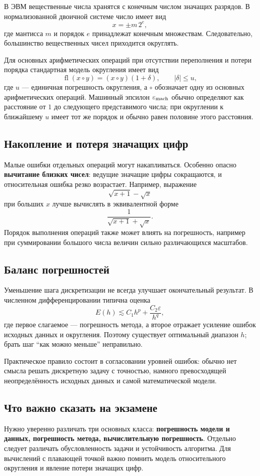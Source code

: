 В ЭВМ вещественные числа хранятся с конечным числом значащих разрядов.
В нормализованной двоичной системе число имеет вид
\[
x=\pm m\,2^e,
\]
где мантисса $m$ и порядок $e$ принадлежат конечным множествам.
Следовательно, большинство вещественных чисел приходится округлять.

Для основных арифметических операций при отсутствии переполнения и
потери порядка стандартная модель округления имеет вид
\[
\boxed{
\operatorname{fl}(x\circ y)
=(x\circ y)(1+\delta),
\qquad |\delta|\le u,
}
\]
где $u$ --- единичная погрешность округления, а $\circ$ обозначает одну из
основных арифметических операций. Машинный эпсилон
$\varepsilon_{\rm mach}$ обычно определяют как расстояние от $1$ до
следующего представимого числа; при округлении к ближайшему $u$ имеет тот
же порядок и обычно равен половине этого расстояния.

\subsection{Накопление и потеря значащих цифр}

Малые ошибки отдельных операций могут накапливаться. Особенно опасно
\textbf{вычитание близких чисел}: ведущие значащие цифры сокращаются, и
относительная ошибка резко возрастает. Например, выражение
\[
\sqrt{x+1}-\sqrt{x}
\]
при больших $x$ лучше вычислять в эквивалентной форме
\[
\frac{1}{\sqrt{x+1}+\sqrt{x}}.
\]
Порядок выполнения операций также может влиять на погрешность, например при
суммировании большого числа величин сильно различающихся масштабов.

\subsection{Баланс погрешностей}

Уменьшение шага дискретизации не всегда улучшает окончательный результат.
В численном дифференцировании типична оценка
\[
E(h)\lesssim C_1h^p+\frac{C_2\varepsilon}{h^q},
\]
где первое слагаемое --- погрешность метода, а второе отражает усиление
ошибок исходных данных и округления. Поэтому существует оптимальный
диапазон $h$; брать шаг ``как можно меньше'' неправильно.

Практическое правило состоит в согласовании уровней ошибок: обычно нет
смысла решать дискретную задачу с точностью, намного превосходящей
неопределённость исходных данных и самой математической модели.

\subsection{Что важно сказать на экзамене}

Нужно уверенно различать три основных класса: \textbf{погрешность модели и
данных, погрешность метода, вычислительную погрешность}. Отдельно следует
различать обусловленность задачи и устойчивость алгоритма. Для вычислений
с плавающей точкой важно помнить модель относительного округления и
явление потери значащих цифр.

\newpage
